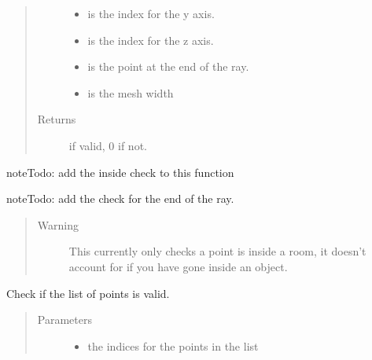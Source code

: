 \documentclass[letterpaper,10pt,english]{sphinxmanual}
\begin{document}
\begin{fulllineitems}
\begin{fulllineitems}
\begin{quote}
\begin{description}
\begin{itemize}
\item {} 
 \textendash{} is the index for the y axis.

\item {} 
 \textendash{} is the index for the z axis.

\item {} 
 \textendash{} is the point at the end of the ray.

\item {} 
 \textendash{} is the mesh width

\end{itemize}

\item[{Returns}]  if valid, 0 if not.

\end{description}\end{quote}

\begin{sphinxadmonition}{note}{\label{\detokenize{index:id1}}Todo:}
add the inside check to this function
\end{sphinxadmonition}

\begin{sphinxadmonition}{note}{\label{\detokenize{index:id2}}Todo:}
add the check for the end of the ray.
\end{sphinxadmonition}
\begin{quote}\begin{description}
\item[{Warning}] \leavevmode
This currently only checks a point is     inside a room, it doesn’t account for if you have gone inside an object.

\end{description}\end{quote}

\end{fulllineitems}


\begin{fulllineitems}
\label{\detokenize{index:DictionarySparseMatrix.DS.stopchecklist}}
Check if the list of points is valid.
\begin{quote}\begin{description}
\item[{Parameters}] \leavevmode\begin{itemize}
\item {} 
 \textendash{} the indices for the points in the list


\end{itemize}
\end{description}
\end{quote}
\end{fulllineitems}
\end{fulllineitems}
\end{document}
